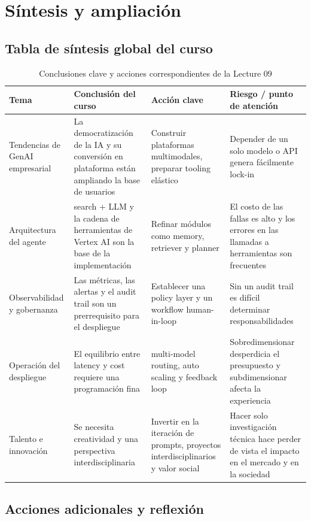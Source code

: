 \documentclass[a4paper]{article}
\begin{document}
\section{Síntesis y ampliación}

\subsection{Tabla de síntesis global del curso}

\begin{table}[H]
\centering
\begin{tabular}{p{} p{} p{} p{}}
\toprule
Tema & Conclusión del curso & Acción clave & Riesgo / punto de atención \\
\midrule
Tendencias de GenAI empresarial & La democratización de la IA y su conversión en plataforma están ampliando la base de usuarios & Construir plataformas multimodales, preparar tooling elástico & Depender de un solo modelo o API genera fácilmente lock-in \\
Arquitectura del agente & search + LLM y la cadena de herramientas de Vertex AI son la base de la implementación & Refinar módulos como memory, retriever y planner & El costo de las fallas es alto y los errores en las llamadas a herramientas son frecuentes \\
Observabilidad y gobernanza & Las métricas, las alertas y el audit trail son un prerrequisito para el despliegue & Establecer una policy layer y un workflow human-in-loop & Sin un audit trail es difícil determinar responsabilidades \\
Operación del despliegue & El equilibrio entre latency y cost requiere una programación fina & multi-model routing, auto scaling y feedback loop & Sobredimensionar desperdicia el presupuesto y subdimensionar afecta la experiencia \\
Talento e innovación & Se necesita creatividad y una perspectiva interdisciplinaria & Invertir en la iteración de prompts, proyectos interdisciplinarios y valor social & Hacer solo investigación técnica hace perder de vista el impacto en el mercado y en la sociedad \\
\bottomrule
\end{tabular}
\caption{Conclusiones clave y acciones correspondientes de la Lecture 09}
\end{table}

\subsection{Acciones adicionales y reflexión}
\end{document}
